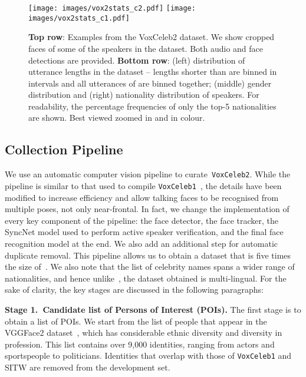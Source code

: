 \documentclass[a4paper]{article}
\def\newpara{\vspace{2pt}}
\def\subsec{\vspace{-5pt}}
\begin{document}
\begin{figure*}[ht]
\vspace{-30pt}
\centering
\texttt{[image: images/vox2stats\_c2.pdf]}
\texttt{[image: images/vox2stats\_c1.pdf]}
   \caption{{\bf Top row}: Examples from the VoxCeleb2 dataset. We show cropped faces of some of the speakers in the dataset. Both audio and face detections are provided. {\bf Bottom row}: (left) distribution of utterance lengths in the dataset -- lengths shorter than  are binned in  intervals and all utterances of  are binned together; (middle) gender distribution and (right) nationality distribution of speakers. For readability, the percentage frequencies of only the top-5 nationalities are shown. Best viewed zoomed in and in colour. }
\label{fig:vox2stats}
\vspace{-14pt}
\end{figure*}



\subsection{Collection Pipeline}
\subsec

We use an automatic computer vision pipeline to
curate~\texttt{VoxCeleb2}. While the pipeline is similar to that used
to compile \texttt{VoxCeleb1}~\cite{Nagrani17}, the details have been
modified to increase efficiency and allow talking faces to be
recognised from multiple poses, not only near-frontal. In fact, we change the
implementation of every key component of the pipeline: the face
detector, the face tracker, the SyncNet model used to perform active
speaker verification, and the final face recognition model at the
end. We also add an additional step for automatic duplicate
removal. This pipeline allows us to obtain a dataset that is five times the size
of~\cite{Nagrani17}. We also note that the list of celebrity names
spans a wider range of nationalities, and hence 
unlike~\cite{Nagrani17}, the dataset obtained is multi-lingual.  For the
sake of clarity, the key stages are discussed in the following
paragraphs: 



\newpara\noindent\textbf{Stage 1.\  Candidate list of Persons of Interest (POIs).}
The first stage is to obtain a list of POIs. We start from the list of people that appear in the VGGFace2 dataset~\cite{cao2017vggface2}, which has considerable ethnic diversity and diversity in profession. This list contains over 9,000 identities, ranging from actors and sportspeople to politicians. 
Identities that overlap with those of \texttt{VoxCeleb1} and SITW are removed from the development set. 
\end{document}
